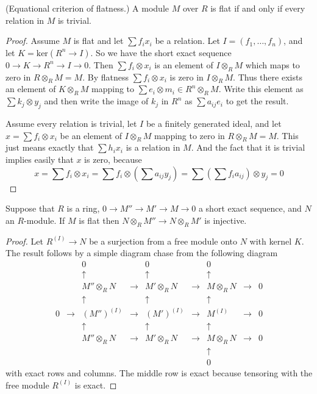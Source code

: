 \begin{lemma}
\label{lemma-flat-eq}
(Equational criterion of flatness.)
A module $M$ over $R$ is flat if and only if
every relation in $M$ is trivial.
\end{lemma}

\begin{proof}
Assume $M$ is flat and let $\sum f_i x_i$ be a relation.
Let $I = (f_1,\ldots,f_n)$, and let $K = \text{ker}(R^n \to I)$.
So we have the short exact sequence
$0\to K \to R^n \to I\to 0$. Then $\sum f_i \otimes x_i$
is an element of $I\otimes_R M$ which maps
to zero in $R\otimes_R M = M$. By flatness
$\sum f_i \otimes x_i$ is zero in $I\otimes_R M$.
Thus there exists an element of $K\otimes_R M$ mapping
to $\sum e_i \otimes m_i \in R^n\otimes_R M$.
Write this element as $\sum k_j \otimes y_j$
and then write the image of $k_j$ in $R^n$ as
$\sum a_{ij} e_i$ to get the result.

\medskip\noindent
Assume every relation is trivial, let $I$
be a finitely generated ideal, and let $x = \sum f_i\otimes x_i$
be an element of $I\otimes_R M$ mapping to zero in $R\otimes_R M = M$.
This just means exactly that $\sum h_i x_i$ is a relation in
$M$. And the fact that it is trivial implies easily that
$x$ is zero, because
$$
x
=
\sum f_i \otimes x_i
=
\sum f_i \otimes (\sum a_{ij}y_j)
=
\sum (\sum f_i a_{ij}) \otimes y_j
=
0
$$
\end{proof}

\begin{lemma}
\label{lemma-flat-tor-zero}
Suppose that $R$ is a ring, $0 \to M'' \to M' \to M \to 0$
a short exact sequence, and $N$ an $R$-module. If $M$ is flat
then $N\otimes_R M'' \to N\otimes_R M'$ is injective.
\end{lemma}

\begin{proof}
Let $R^{(I)} \to N$ be a surjection from a free module
onto $N$ with kernel $K$. The result follows
by a simple diagram chase from the following diagram
$$
\begin{matrix}
&
&
0
&
&
0
&
&
0
&
&
\\
&
&
\uparrow
&
&
\uparrow
&
&
\uparrow
&
&
\\
&
&
M''\otimes_R N
&
\to
&
M' \otimes_R N
&
\to
&
M\otimes_R N
&
\to
&
0
\\
&
&
\uparrow
&
&
\uparrow
&
&
\uparrow
&
&
\\
0
&
\to
&
(M'')^{(I)}
&
\to
&
(M')^{(I)}
&
\to
&
M^{(I)}
&
\to
&
0
\\
&
&
\uparrow
&
&
\uparrow
&
&
\uparrow
&
&
\\
&
&
M''\otimes_R N
&
\to
&
M' \otimes_R N
&
\to
&
M\otimes_R N
&
\to
&
0
\\
&
&
&
&
&
&
\uparrow
&
&
\\
&
&
&
&
&
&
0
&
&
\end{matrix}
$$
with exact rows and columns. The middle row is exact because tensoring
with the free module $R^{(I)}$ is exact.
\end{proof}


